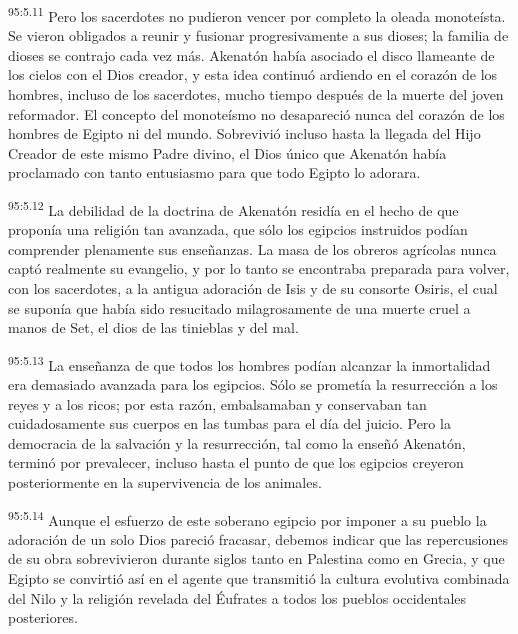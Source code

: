 \par
\textsuperscript{95:5.11} Pero los sacerdotes no pudieron vencer por completo la oleada monoteísta. Se vieron obligados a reunir y fusionar progresivamente a sus dioses; la familia de dioses se contrajo cada vez más. Akenatón había asociado el disco llameante de los cielos con el Dios creador, y esta idea continuó ardiendo en el corazón de los hombres, incluso de los sacerdotes, mucho tiempo después de la muerte del joven reformador. El concepto del monoteísmo no desapareció nunca del corazón de los hombres de Egipto ni del mundo. Sobrevivió incluso hasta la llegada del Hijo Creador de este mismo Padre divino, el Dios único que Akenatón había proclamado con tanto entusiasmo para que todo Egipto lo adorara.

\par
\textsuperscript{95:5.12} La debilidad de la doctrina de Akenatón residía en el hecho de que proponía una religión tan avanzada, que sólo los egipcios instruidos podían comprender plenamente sus enseñanzas. La masa de los obreros agrícolas nunca captó realmente su evangelio, y por lo tanto se encontraba preparada para volver, con los sacerdotes, a la antigua adoración de Isis y de su consorte Osiris, el cual se suponía que había sido resucitado milagrosamente de una muerte cruel a manos de Set, el dios de las tinieblas y del mal.

\par
\textsuperscript{95:5.13} La enseñanza de que todos los hombres podían alcanzar la inmortalidad era demasiado avanzada para los egipcios. Sólo se prometía la resurrección a los reyes y a los ricos; por esta razón, embalsamaban y conservaban tan cuidadosamente sus cuerpos en las tumbas para el día del juicio. Pero la democracia de la salvación y la resurrección, tal como la enseñó Akenatón, terminó por prevalecer, incluso hasta el punto de que los egipcios creyeron posteriormente en la supervivencia de los animales.

\par
\textsuperscript{95:5.14} Aunque el esfuerzo de este soberano egipcio por imponer a su pueblo la adoración de un solo Dios pareció fracasar, debemos indicar que las repercusiones de su obra sobrevivieron durante siglos tanto en Palestina como en Grecia, y que Egipto se convirtió así en el agente que transmitió la cultura evolutiva combinada del Nilo y la religión revelada del Éufrates a todos los pueblos occidentales posteriores.

